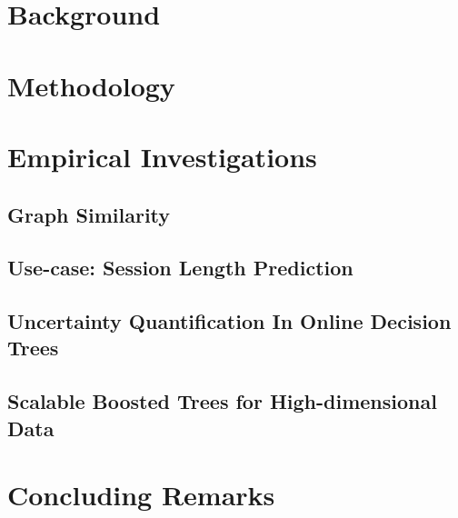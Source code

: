 \documentclass[g5paper,twoside,phd,electronic]{kthesis}
\begin{document}
\frontmatter
\maketitle
\makecopyright
\makededication



\tableofcontents*
\listoffigures
\listoftables
\listofalgorithms
\mainmatter

\newpage
\part{Background}
\label{part:bg}

\newpage

\newpage

\newpage

\newpage
\part{Methodology}

\newpage
\part{Empirical Investigations}
\label{part:results}
\chapter{Graph Similarity}
\label{ch:concepts}

\newpage
\chapter{Use-case: Session Length Prediction}
\label{ch:session-length}

\newpage
\chapter{Uncertainty Quantification In Online Decision Trees}
\label{ch:uncertain-trees}

\newpage
\chapter{Scalable Boosted Trees for High-dimensional Data}
\label{ch:boosted-trees}

\newpage
\part{Concluding Remarks}
\label{part:conclusion}

\newpage

\backmatter
\printindex

\end{document}
